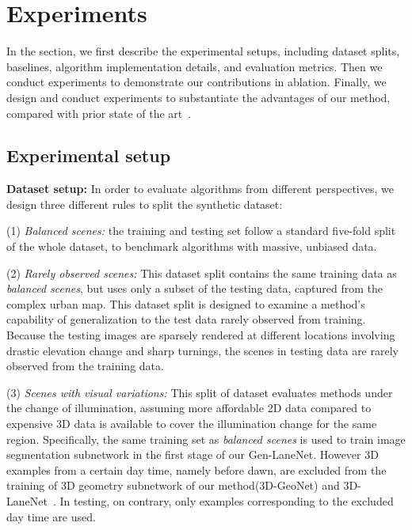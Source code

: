 \documentclass[10pt,twocolumn,letterpaper]{article}
\begin{document}
\section{Experiments}
\label{sec:exp}

In the section, we first describe the experimental setups, including dataset splits, baselines, algorithm implementation details, and evaluation metrics. Then we conduct experiments to demonstrate our contributions in ablation. Finally, we design and conduct experiments to substantiate the advantages of our method, compared with prior state of the art~\cite{Garnett:etal:ICCV2019}.

  \subsection{Experimental setup}
{\bf Dataset setup:} In order to evaluate algorithms from different perspectives, we design three different rules to split the synthetic dataset:

(1) {\it Balanced scenes:} the training and testing set follow a standard five-fold split of the whole dataset, to benchmark  algorithms with massive, unbiased data.

(2) {\it Rarely observed scenes:} This dataset split contains the same training data as {\it balanced scenes}, but uses only a subset of the testing data, captured from the complex urban map. This dataset split is designed to examine a method's capability of generalization to the test data rarely observed from training. Because the testing images are sparsely rendered at different locations involving drastic elevation change and sharp turnings, the scenes in testing data are rarely observed from the training data.

(3) {\it Scenes with visual variations:} This split of dataset evaluates methods under the change of illumination, assuming more affordable 2D data compared to expensive 3D data is available to cover the illumination change for the same region. Specifically, the same training set as  {\it balanced scenes} is used to train image segmentation subnetwork in the first stage of our Gen-LaneNet. However 3D examples from a certain day time, namely before dawn, are excluded from the training of 3D geometry subnetwork of our method(3D-GeoNet) and 3D-LaneNet~\cite{Garnett:etal:ICCV2019}. In testing, on contrary, only examples corresponding to the excluded day time are used.
\end{document}
